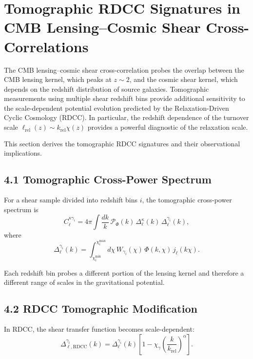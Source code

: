 \documentclass[11pt,a4paper]{article}
\begin{document}
\section{Tomographic RDCC Signatures in CMB Lensing--Cosmic Shear Cross-Correlations}

The CMB lensing--cosmic shear cross-correlation probes the overlap between the CMB lensing 
kernel, which peaks at $z \sim 2$, and the cosmic shear kernel, which depends on the 
redshift distribution of source galaxies. Tomographic measurements using multiple shear 
redshift bins provide additional sensitivity to the scale-dependent potential evolution 
predicted by the Relaxation-Driven Cyclic Cosmology (RDCC). In particular, the redshift 
dependence of the turnover scale $\ell_{\mathrm{rel}}(z) \sim k_{\mathrm{rel}} \chi(z)$ 
provides a powerful diagnostic of the relaxation scale.

This section derives the tomographic RDCC signatures and their observational implications.

\subsection*{4.1 Tomographic Cross-Power Spectrum}

For a shear sample divided into redshift bins $i$, the tomographic cross-power spectrum is
\begin{equation}
    C_{\ell}^{\kappa\gamma_{i}}
    = 4\pi \int \frac{dk}{k}\,
      \mathcal{P}_{\Phi}(k)\,
      \Delta_{\ell}^{\kappa}(k)\,
      \Delta_{\ell}^{\gamma_{i}}(k),
\end{equation}
where
\begin{equation}
    \Delta_{\ell}^{\gamma_{i}}(k)
    = \int_{\chi_{i}^{\mathrm{min}}}^{\chi_{i}^{\mathrm{max}}}
      d\chi\,
      W_{\gamma_{i}}(\chi)\,
      \Phi(k,\chi)\,
      j_{\ell}(k\chi).
\end{equation}

Each redshift bin probes a different portion of the lensing kernel and therefore a 
different range of scales in the gravitational potential.

\subsection*{4.2 RDCC Tomographic Modification}

In RDCC, the shear transfer function becomes scale-dependent:
\begin{equation}
    \Delta_{\ell,\mathrm{RDCC}}^{\gamma_{i}}(k)
    = \Delta_{\ell}^{\gamma_{i}}(k)
      \left[
        1 - \chi_{\gamma}
        \left(\frac{k}{k_{\mathrm{rel}}}\right)^{\alpha}
      \right].
\end{equation}
\end{document}
